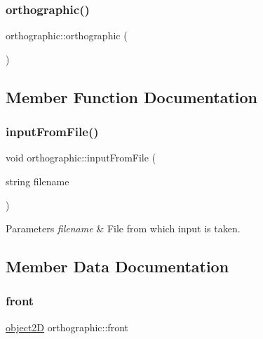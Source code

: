 \subsubsection{\texorpdfstring{orthographic()}{orthographic()}\hspace{0.1cm}{\footnotesize\ttfamily [2/2]}}
{\footnotesize\ttfamily orthographic\+::orthographic (\begin{DoxyParamCaption}{ }\end{DoxyParamCaption})}



\subsection{Member Function Documentation}
\mbox{\label{classorthographic_a0d8e45328b99b53d243bffc5f5d795b6}} 
\subsubsection{\texorpdfstring{input\+From\+File()}{inputFromFile()}}
{\footnotesize\ttfamily void orthographic\+::input\+From\+File (\begin{DoxyParamCaption}\item[{string}]{filename }\end{DoxyParamCaption})}


\begin{DoxyParams}{Parameters}
{\em filename} & File from which input is taken. \\
\hline
\end{DoxyParams}


\subsection{Member Data Documentation}
\mbox{\label{classorthographic_a4612638f537edd8d23c95061669a2599}} 
\subsubsection{\texorpdfstring{front}{front}}
{\footnotesize\ttfamily \mbox{\hyperlink{classobject2D}{object2D}} orthographic\+::front}

